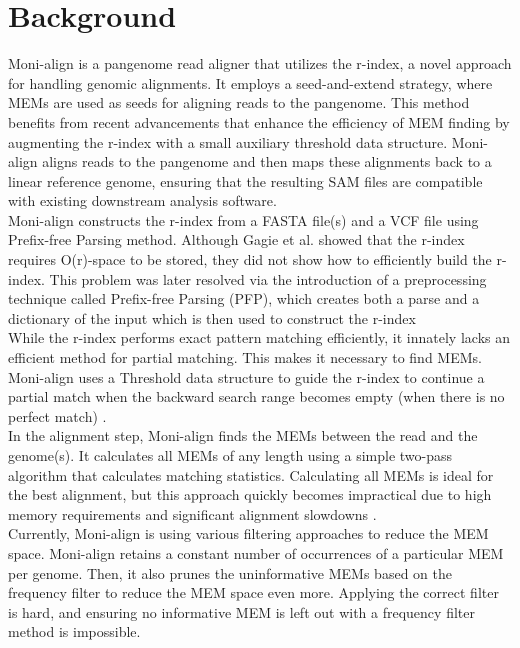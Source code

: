 \documentclass[11pt]{ucthesis}
\begin{document}
\section{Background}
Moni-align is a pangenome read aligner that utilizes the r-index, a novel approach for handling genomic alignments. It employs a seed-and-extend strategy, where MEMs are used as seeds for aligning reads to the pangenome. This method benefits from recent advancements that enhance the efficiency of MEM finding by augmenting the r-index with a small auxiliary threshold data structure. Moni-align aligns reads to the pangenome and then maps these alignments back to a linear reference genome, ensuring that the resulting SAM files are compatible with existing downstream analysis software.\\
Moni-align constructs the r-index from a FASTA file(s) and a VCF file using Prefix-free Parsing method. Although Gagie et al. \cite{gagie2020fully} showed that the r-index requires O(r)-space to be stored, they did not show how to efficiently build the r-index. This problem was later resolved via the introduction of a preprocessing technique called Prefix-free Parsing (PFP), which creates both a parse and a dictionary of the input which is then used to construct the r-index \cite{doi:10.1089/cmb.2019.0309,boucher2019prefix}\\
While the r-index performs exact pattern matching efficiently, it innately lacks an efficient method for partial matching. This makes it necessary to find MEMs. Moni-align uses a Threshold data structure to guide the r-index to continue a partial match when the backward search range becomes empty (when there is no perfect match) \cite{bannai2020refining}.\\
In the alignment step, Moni-align finds the MEMs between the read and the genome(s). It calculates all MEMs of any length using a simple two-pass algorithm that calculates matching statistics. Calculating all MEMs is ideal for the best alignment, but this approach quickly becomes impractical due to high memory requirements and significant alignment slowdowns \cite{roberts2004reducing}. \\
Currently, Moni-align is using various filtering approaches to reduce the MEM space. Moni-align retains a constant number of occurrences of a particular MEM per genome. Then, it also prunes the uninformative MEMs based on the frequency filter to reduce the MEM space even more. Applying the correct filter is hard, and ensuring no informative MEM is left out with a frequency filter method is impossible. 
\end{document}
